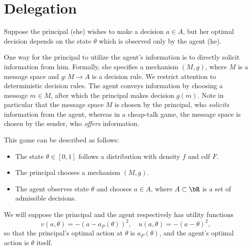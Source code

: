 \chapter{Delegation}

Suppose the principal (she) wishes to make a decision \(a \in A\), but her optimal decision depends on the state \(\theta\) which is observed only by the agent (he).

One way for the principal to utilize the agent's information is to directly solicit information from him.
Formally, she specifies a mechanism \((M, g)\), where \(M\) is a message space and \(g: M \to A\) is a decision rule.
We restrict attention to deterministic decision rules.
The agent conveys information by choosing a message \(m \in M\), after which the principal makes decision \(g(m)\).
Note in particular that the message space \(M\) is chosen by the principal, who \emph{solicits} information from the agent, whereas in a cheap-talk game, the message space is chosen by the sender, who \emph{offers} information.

This game can be described as follows:
\begin{itemize}
  \item The state \(\theta \in [0, 1]\) follows a distribution with density \(f\) and cdf \(F\).
  \item The principal chooses a mechanism \((M, g)\).
  \item The agent observes state \(\theta\) and chooses \(a \in A\), where \(A \subset \bR\) is a set of admissible decisions.
\end{itemize}
We will suppose the principal and the agent respectively has utility functions
\[
  v(a, \theta)
  = -(a - a_P(\theta))^2,\quad
  u(a, \theta)
  = -(a - \theta)^2,
\]
so that the principal's optimal action at \(\theta\) is \(a_P(\theta)\), and the agent's optimal action is \(\theta\) itself.

